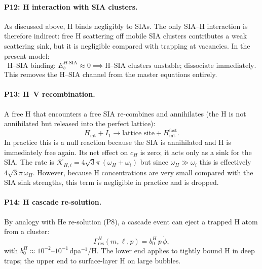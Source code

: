 \paragraph{P12: H interaction with SIA clusters.}
As discussed above, H binds negligibly to SIAs.  The only SIA--H
interaction is therefore indirect: free H scattering off mobile SIA
clusters contributes a weak scattering sink, but it is negligible compared
with trapping at vacancies.  In the present model:
\begin{equation}\label{eq:P12}
    \text{H--SIA binding: }E_b^{H\text{-SIA}} \approx 0
    \implies
    \text{H--SIA clusters unstable; dissociate immediately.}
\end{equation}
This removes the H--SIA channel from the master equations entirely.

\paragraph{P13: H--V recombination.}
A free H that encounters a free SIA re-combines and annihilates (the H
is not annihilated but released into the perfect lattice):
\begin{equation}\label{eq:P13}
    H_{\mathrm{int}} + I_1 \to \text{lattice site} + H_{\mathrm{int}}^{\mathrm{fast}}.
\end{equation}
In practice this is a null reaction because the SIA is annihilated and H
is immediately free again.  Its net effect on $c_H$ is zero; it acts only
as a sink for the SIA. The rate is $\mathcal{K}_{H,i} = 4\sqrt{3}\pi\,
(\omega_H + \omega_i)$ but since $\omega_H \gg \omega_i$ this is
effectively $4\sqrt{3}\pi\,\omega_H$.  However, because H concentrations
are very small compared with the SIA sink strengths, this term is
negligible in practice and is dropped.

\paragraph{P14: H cascade re-solution.}
By analogy with He re-solution (P8), a cascade event can eject a trapped
H atom from a cluster:
\begin{equation}\label{eq:P14}
    \Gamma_{\mathrm{res}}^H(m,\ell,p) = b_0^H\,p\,\dot{\phi},
\end{equation}
with $b_0^H \approx 10^{-2}$--$10^{-1}$\,dpa$^{-1}$/H.  The lower end
applies to tightly bound H in deep traps; the upper end to surface-layer
H on large bubbles.

